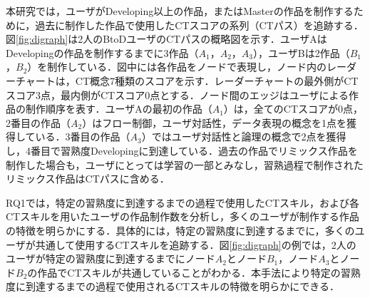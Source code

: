 \documentclass[submit]{ipsj}
\newcommand{\todo}[1]{\colorbox{yellow}{{\bf TODO}:}{\color{red} {\textbf{[#1]}}}}
\begin{document}
本研究では，ユーザがDeveloping以上の作品，またはMasterの作品を制作するために，過去に制作した作品で使用したCTスコアの系列（CTパス）を追跡する．
図\ref{fig:digraph}は2人のBtoDユーザのCTパスの概略図を示す．ユーザAはDevelopingの作品を制作するまでに3作品（$A_1$，$A_2$，$A_3$），ユーザBは2作品（$B_1$，$B_2$）を制作している．図中には各作品をノードで表現し，ノード内のレーダーチャートは，CT概念7種類のスコアを示す．レーダーチャートの最外側がCTスコア3点，最内側がCTスコア0点とする．ノード間のエッジはユーザによる作品の制作順序を表す．ユーザAの最初の作品（$A_1$）は，全てのCTスコアが0点，2番目の作品（$A_2$）はフロー制御，ユーザ対話性，データ表現の概念を1点を獲得している．3番目の作品（$A_3$）ではユーザ対話性と論理の概念で2点を獲得し，4番目で習熟度Developingに到達している．過去の作品でリミックス作品を制作した場合も，ユーザにとっては学習の一部とみなし，習熟過程で制作されたリミックス作品はCTパスに含める．


RQ1では，特定の習熟度に到達するまでの過程で使用したCTスキル，および各CTスキルを用いたユーザの作品制作数を分析し，多くのユーザが制作する作品の特徴を明らかにする．具体的には，特定の習熟度に到達するまでに，多くのユーザが共通して使用するCTスキルを追跡する．図\ref{fig:digraph}の例では，2人のユーザが特定の習熟度に到達するまでにノード$A_2$とノード$B_1$，ノード$A_3$とノード$B_2$の作品でCTスキルが共通していることがわかる．本手法により特定の習熟度に到達するまでの過程で使用されるCTスキルの特徴を明らかにできる．

\end{document}
